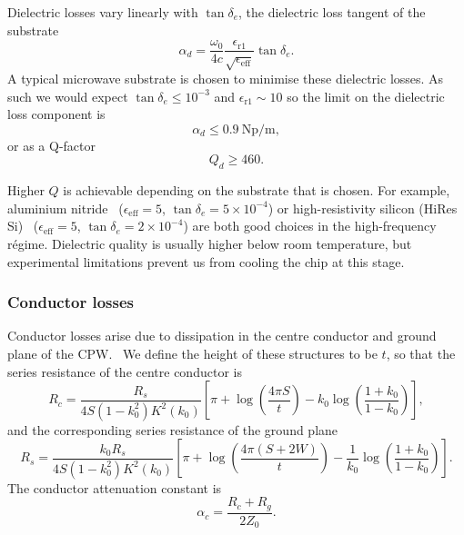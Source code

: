 Dielectric losses vary linearly with $\tan \delta_e$, the dielectric loss
tangent of the substrate~\cite{Collin2007}
\begin{equation}
  \alpha_d =
  \frac{\omega_0}{4c}\frac{\epsilon_\mathrm{r1}}{\sqrt{\epsilon_\mathrm{eff}}}
  \tan \delta_e.
\end{equation}
A typical microwave substrate is chosen to minimise these dielectric losses. As
such we would expect $\tan\delta_e\leq10^{-3}$ and
$\epsilon_\mathrm{r1} \sim 10$ so the limit on the dielectric loss component is
%
%
\begin{equation}
  \alpha_d \leq \SI{0.9}{\neper\per\meter},
\end{equation}
or as a Q-factor
\begin{equation}
  Q_d \geq 460.
\end{equation}

Higher $Q$ is achievable depending on the substrate that is chosen. For example,
aluminium nitride~\cite{mw101}  ($\epsilon_\mathrm{eff}=5$, $\tan\delta_e = 5\times10^{-4}$)
or high-resistivity silicon (HiRes Si)~\cite{1717770}
($\epsilon_\mathrm{eff}=5$, $\tan\delta_e =2\times10^{-4}$) are both good
choices in the high-frequency r\'egime.  Dielectric quality is usually higher
below room temperature, but experimental limitations prevent us from cooling the
chip at this stage.

\subsubsection*{Conductor losses}

Conductor losses arise due to dissipation in the centre conductor and ground
plane of the CPW.~\cite{Simons2004} We define the height of these structures to
be $t$, so that the series resistance of the centre conductor is
\begin{equation}
  R_c = \frac{R_s}{4 S(1-k_0^2)K^2(k_0)}\left[ \pi + \log\left(\frac{4\pi
  S}{t}\right) - k_0\log\left(\frac{1+k_0}{1-k_0}\right) \right],
\end{equation}
and the corresponding series resistance of the ground plane
\begin{equation}
  R_s = \frac{k_0 R_s}{4S(1-k_0^2)K^2(k_0)}\left[\pi +
  \log\left(\frac{4\pi(S+2W)}{t}\right) -
  \frac{1}{k_0}\log\left(\frac{1+k_0}{1-k_0}\right)\right].
\end{equation}
The conductor attenuation constant is
\begin{equation}
  \alpha_c = \frac{R_c +R_g}{2Z_0}.
\end{equation}

